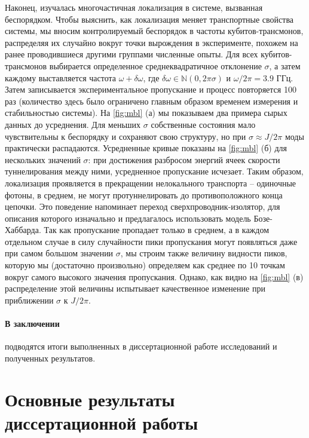 \documentclass[14pt, a4paper]{extarticle}
\begin{document}
Наконец, изучалась многочастичная локализация в системе, вызванная беспорядком. Чтобы выяснить, как локализация меняет транспортные свойства системы, мы вносим контролируемый беспорядок в частоты кубитов\hyp трансмонов, распределяя их случайно вокруг точки вырождения в эксперименте, похожем на ранее проводившиеся другими группами численные опыты. Для всех кубитов\hyp трансмонов выбирается определенное среднеквадратичное отклонение $\sigma$, а затем каждому выставляется частота $\omega + \delta \omega$, где $\delta \omega \in \mathbb{N}(0, 2\pi \sigma)$ и $\omega/2\pi = 3.9$ ГГц. Затем записывается экспериментальное пропускание и процесс повторяется 100 раз (количество здесь было ограничено главным образом временем измерения и стабильностью системы). На \autoref{fig:mbl} (а) мы показываем два примера сырых данных до усреднения. Для меньших $\sigma$ собственные состояния мало чувствительны к беспорядку и сохраняют свою структуру, но при $\sigma \approx J/2\pi$ моды практически распадаются. Усредненные кривые показаны на \autoref{fig:mbl} (б) для нескольких значений $\sigma$: при достижения разбросом энергий ячеек скорости туннелирования между ними, усредненное пропускание исчезает. Таким образом, локализация проявляется в прекращении нелокального транспорта -- одиночные фотоны, в среднем, не могут протуннелировать до противоположного конца цепочки. Это поведение напоминает переход сверхпроводник-изолятор, для описания которого изначально и предлагалось использовать модель Бозе-Хаббарда. Так как пропускание пропадает только в среднем, а в каждом отдельном случае в силу случайности пики пропускания могут появляться даже при самом большом значении $\sigma$, мы строим также величину видности пиков, которую мы (достаточно произвольно) определяем как среднее по 10 точкам вокруг самого высокого значения пропускания. Однако, как видно на \autoref{fig:mbl} (в) распределение этой величины испытывает качественное изменение при приближении $\sigma$ к $J/2\pi$.

\paragraph{В заключении} подводятся итоги выполненных в диссертационной работе исследований и полученных результатов.
	
\section*{Основные результаты диссертационной работы}
\end{document}

